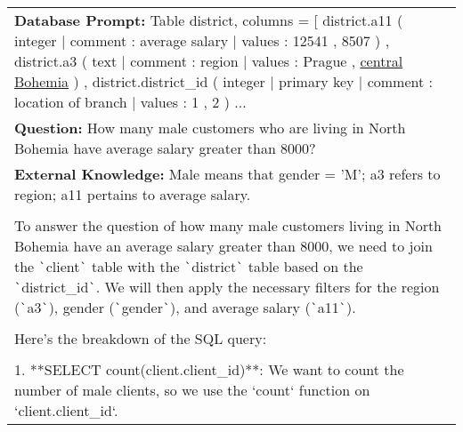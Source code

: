 \begin{table*}[htbp]
\centering
\begin{tcolorbox}[
    colback=white, %
    colframe=black, %
    title=Response, %
    fonttitle=\bfseries, %
    width=\textwidth, %
    boxrule=1pt, %
    rounded corners, %
]

\begin{tabularx}{\textwidth}{X}
\textbf{Database Prompt:} Table district, columns = [ district.a11 ( integer | comment : average salary | values : 12541 , 8507 ) ,
district.a3 ( text | comment : region | values : Prague , \underline{central Bohemia} ) , district.district\_id ( integer | primary
key | comment : location of branch | values : 1 , 2 ) ... \\
\textbf{Question:} How many male customers who are living in North Bohemia have average salary greater than 8000? \\ 
\textbf{External Knowledge:} Male means that gender = 'M'; a3 refers to region; a11 pertains to average salary. \\
\hline
\\ %

To answer the question of how many male customers living in North Bohemia have an average salary greater than 8000, we need to join the \verb|`|client\verb|`| table with the \verb|`|district\verb|`| table based on the \verb|`|district\_id\verb|`|. We will then apply the necessary filters for the region (\verb|`|a3\verb|`|), gender (\verb|`|gender\verb|`|), and average salary (\verb|`|a11\verb|`|).
\\ \\ 
Here's the breakdown of the SQL query:
\\ \\ 
1. **SELECT count(client.client\_id)**: We want to count the number of male clients, so we use the `count` function on `client.client\_id`. \\


\end{tabularx}
\end{tcolorbox}
\end{table*}

